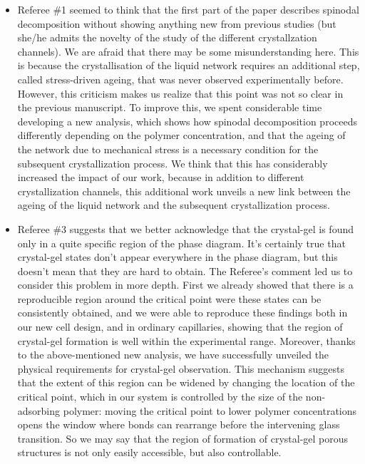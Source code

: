 \documentclass[11pt,a4paper]{article}
\begin{document}
\begin{itemize}
 \item Referee \#1 seemed to think that the first part of the paper describes spinodal decomposition without showing anything new from previous studies (but she/he admits the novelty of the study of the different crystallzation channels). 
We are afraid that there may be some misunderstanding here. 
This is because the crystallisation of the liquid network requires an additional step, called stress-driven ageing, 
that was never observed experimentally before. However, this criticism makes us realize that this point was not so clear 
in the previous manuscript. 
To improve this, we spent considerable time developing a new analysis, which shows how spinodal decomposition proceeds differently depending on the polymer concentration, and that the ageing of the network due to mechanical stress is a necessary condition for the subsequent crystallization process. We think that this has considerably increased the impact of our work, because in addition to different crystallization channels, this additional work unveils a new link between the ageing of the liquid network and the subsequent crystallization process.
\item Referee \#3 suggests that we better acknowledge that the crystal-gel is found only in a quite specific region of the phase diagram. 
It's certainly true that crystal-gel states don't appear everywhere in the phase diagram, but this doesn't mean that they are hard to obtain. 
The Referee's comment led us to consider this problem in more depth. 
First we already showed that there is a reproducible region around the critical point were these states can be consistently obtained, and we were able to reproduce these findings both in our new cell design, and in ordinary capillaries, showing that the region of crystal-gel formation is well within the experimental range. Moreover, thanks to the above-mentioned new analysis, we have successfully unveiled the physical requirements for crystal-gel observation. This mechanism suggests that the extent of this region can be widened by changing the location of the critical point, which in our system is controlled by the size of the non-adsorbing polymer: moving the critical point to lower polymer concentrations opens the window where bonds can rearrange before the intervening glass transition. So we may say that the region of formation of crystal-gel porous structures is not only easily accessible, but also controllable.
\end{itemize}
\end{document}
